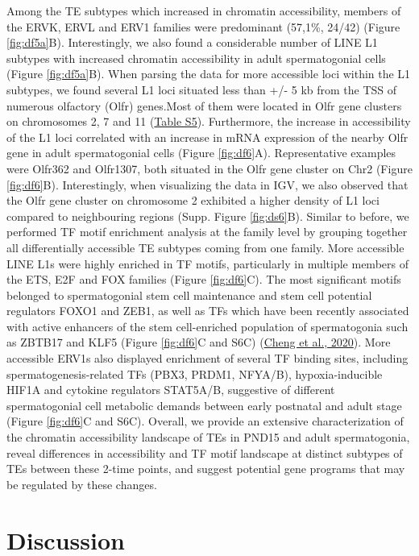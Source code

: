 \documentclass[12pt,twoside]{reedthesis}
\begin{document}
Among the TE subtypes which increased in chromatin accessibility,
members of the ERVK, ERVL and ERV1 families were predominant (57,1\%,
24/42) (Figure \ref{fig:df5a}B). Interestingly, we also found a considerable number of
LINE L1 subtypes with increased chromatin accessibility in adult
spermatogonial cells (Figure \ref{fig:df5a}B). When parsing the data for more
accessible loci within the L1 subtypes, we found several L1 loci
situated less than +/- 5 kb from the TSS of numerous olfactory (Olfr)
genes.Most of them were located in Olfr gene clusters on chromosomes 2,
7 and 11 (\protect\hyperlink{st}{Table S5}). Furthermore, the increase in accessibility of the
L1 loci correlated with an increase in mRNA expression of the nearby
Olfr gene in adult spermatogonial cells (Figure \ref{fig:df6}A). Representative
examples were Olfr362 and Olfr1307, both situated in the Olfr gene
cluster on Chr2 (Figure \ref{fig:df6}B). Interestingly, when visualizing the data in
IGV, we also observed that the Olfr gene cluster on chromosome 2
exhibited a higher density of L1 loci compared to neighbouring regions
(Supp. Figure \ref{fig:ds6}B). Similar to before, we performed TF motif enrichment analysis
at the family level by grouping together all differentially accessible
TE subtypes coming from one family. More accessible LINE L1s were highly
enriched in TF motifs, particularly in multiple members of the ETS, E2F
and FOX families (Figure \ref{fig:df6}C). The most significant motifs belonged to
spermatogonial stem cell maintenance and stem cell potential regulators
FOXO1 and ZEB1, as well as TFs which have been recently associated with
active enhancers of the stem cell-enriched population of spermatogonia
such as ZBTB17 and KLF5 (Figure \ref{fig:df6}C and S6C) (\protect\hyperlink{ref-cheng2020}{Cheng et al., 2020}). More accessible
ERV1s also displayed enrichment of several TF binding sites, including
spermatogenesis-related TFs (PBX3, PRDM1, NFYA/B), hypoxia-inducible
HIF1A and cytokine regulators STAT5A/B, suggestive of different
spermatogonial cell metabolic demands between early postnatal and adult
stage (Figure \ref{fig:df6}C and S6C). Overall, we provide an extensive
characterization of the chromatin accessibility landscape of TEs in
PND15 and adult spermatogonia, reveal differences in accessibility and
TF motif landscape at distinct subtypes of TEs between these 2-time
points, and suggest potential gene programs that may be regulated by
these changes.

\hypertarget{discussion}{%
\section{Discussion}\label{discussion}}
\end{document}
